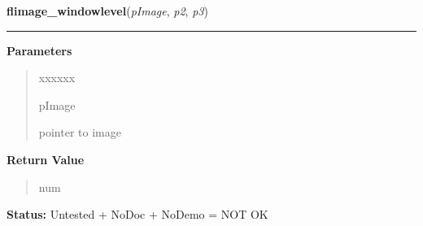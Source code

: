 \hspace{.8\funcindent}\begin{boxedminipage}{\funcwidth}

    \raggedright \textbf{flimage\_windowlevel}(\textit{pImage}, \textit{p2}, \textit{p3})

    \vspace{-1.5ex}

    \rule{\textwidth}{0.5\fboxrule}
\setlength{\parskip}{2ex}
\setlength{\parskip}{1ex}
      \textbf{Parameters}
      \vspace{-1ex}

      \begin{quote}
        \begin{Ventry}{xxxxxx}

          \item[pImage]

          pointer to image

        \end{Ventry}

      \end{quote}

      \textbf{Return Value}
    \vspace{-1ex}

      \begin{quote}
      num

      \end{quote}

\textbf{Status:} Untested + NoDoc + NoDemo = NOT OK



    \end{boxedminipage}

    \label{xformslib:flflimage:flimage_enhance}

    \vspace{0.5ex}

